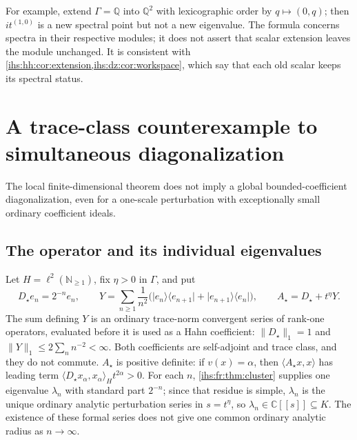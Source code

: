 \documentclass[11pt,a4paper]{article}
\numberwithin{equation}{section}
\theoremstyle{definition}
\theoremstyle{remark}
\newcommand{\C}{\mathbb C}
\newcommand{\Q}{\mathbb Q}
\newcommand{\N}{\mathbb N}
\newcommand{\K}{K}
\newcommand{\norm}[1]{\lVert#1\rVert}
\newcommand{\ip}[2]{\langle#1,#2\rangle}
\begin{document}
For example, extend $\Gamma=\Q$ into $\Q^2$ with lexicographic order by
$q\mapsto(0,q)$; then $it^{(1,0)}$ is a new spectral point but not a new
eigenvalue. The formula concerns spectra in their respective modules; it
does not assert that scalar extension leaves the module unchanged. It is
consistent with \cref{ihs:hh:cor:extension,ihs:dz:cor:workspace}, which say
that each old scalar keeps its spectral status.

\section{A trace-class counterexample to simultaneous diagonalization}\label{ihs:fr:sec:obstruction}

The local finite-dimensional theorem does not imply a global
bounded-coefficient diagonalization, even for a one-scale perturbation with
exceptionally small ordinary coefficient ideals.

\subsection{The operator and its individual eigenvalues}\label{ihs:fr:sec:operator}
Let $H=\ell^2(\N_{\ge1})$, fix $\eta>0$ in $\Gamma$, and put
\begin{equation}\label{ihs:fr:eq:counterexample}
 D_\star e_n=2^{-n}e_n,\qquad
 Y=\sum_{n\ge1}\frac1{n^2}\bigl(\lvert e_n\rangle\langle e_{n+1}\rvert
       +\lvert e_{n+1}\rangle\langle e_n\rvert\bigr),\qquad
 A_\star=D_\star+t^\eta Y.
\end{equation}
The sum defining $Y$ is an ordinary trace-norm convergent series of rank-one
operators, evaluated before it is used as a Hahn coefficient:
$\norm{D_\star}_1=1$ and $\norm Y_1\le2\sum_n n^{-2}<\infty$. Both
coefficients are self-adjoint and trace class, and they do not commute.
$A_\star$ is positive definite: if $v(x)=\alpha$, then $\ip{A_\star x}x$ has
leading term $\ip{D_\star x_\alpha}{x_\alpha}_Ht^{2\alpha}>0$. For each $n$,
\cref{ihs:fr:thm:cluster} supplies one eigenvalue $\lambda_n$ with standard
part $2^{-n}$; since that residue is simple, $\lambda_n$ is the unique
ordinary analytic perturbation series in $s=t^\eta$, so
$\lambda_n\in\C[[s]]\subseteq\K$. The existence of these formal series does
not give one common ordinary analytic radius as $n\to\infty$.
\end{document}
